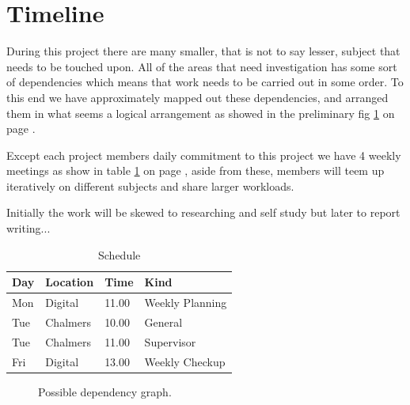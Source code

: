 \newpage
\section{Timeline}
During this project there are many smaller, that is not to say lesser, subject that needs to be touched upon. All of the areas that need investigation has some sort of dependencies which means that work needs to be carried out in some order. To this end we have approximately mapped out these dependencies, and arranged them in what seems a logical arrangement as showed in the preliminary fig \ref{fig:dependency_graph} on page \pageref{fig:dependency_graph}.   

Except each project members daily commitment to this project we have 4 weekly meetings as show in table \ref{tab:schedule} on page \pageref{tab:schedule}, aside from these, members will teem up iteratively on different subjects and share larger workloads.  

Initially the work will be skewed to researching and self study but later to report writing...

\begin{table}[]
\centering
\begin{tabular}{llll}
\hline
Day & Location & Time  & Kind            \\ \hline
Mon & Digital  & 11.00 & Weekly Planning \\
Tue & Chalmers & 10.00 & General         \\
Tue & Chalmers & 11.00 & Supervisor      \\
Fri & Digital  & 13.00 & Weekly Checkup 
\end{tabular}
\caption{Schedule}
\label{tab:schedule}
\end{table}


\begin{figure}
  \caption{Possible dependency graph.}
  \label{fig:dependency_graph}
\end{figure}

